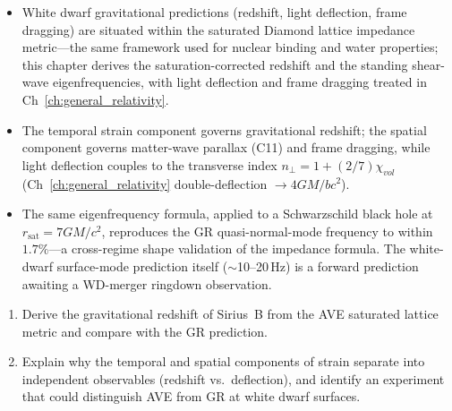 \begin{summarybox}
\begin{itemize}
    \item White dwarf gravitational predictions (redshift, light deflection, frame dragging) are situated within the saturated Diamond lattice impedance metric---the same framework used for nuclear binding and water properties; this chapter derives the saturation-corrected redshift and the standing shear-wave eigenfrequencies, with light deflection and frame dragging treated in Ch~\ref{ch:general_relativity}.
    \item The temporal strain component governs gravitational redshift; the spatial component governs matter-wave parallax (C11) and frame dragging, while light deflection couples to the transverse index $n_\perp = 1 + (2/7)\chi_{vol}$ (Ch~\ref{ch:general_relativity} double-deflection $\to 4GM/bc^2$).
    \item The same eigenfrequency formula, applied to a Schwarzschild black hole at $r_{\text{sat}} = 7GM/c^2$, reproduces the GR quasi-normal-mode frequency to within $1.7\%$---a cross-regime shape validation of the impedance formula. The white-dwarf surface-mode prediction itself ($\sim$10--20\,Hz) is a forward prediction awaiting a WD-merger ringdown observation.
\end{itemize}
\end{summarybox}

\begin{exercisebox}
\begin{enumerate}
    \item Derive the gravitational redshift of Sirius~B from the AVE saturated lattice metric and compare with the GR prediction.
    \item Explain why the temporal and spatial components of strain separate into independent observables (redshift vs.~deflection), and identify an experiment that could distinguish AVE from GR at white dwarf surfaces.
\end{enumerate}
\end{exercisebox}


